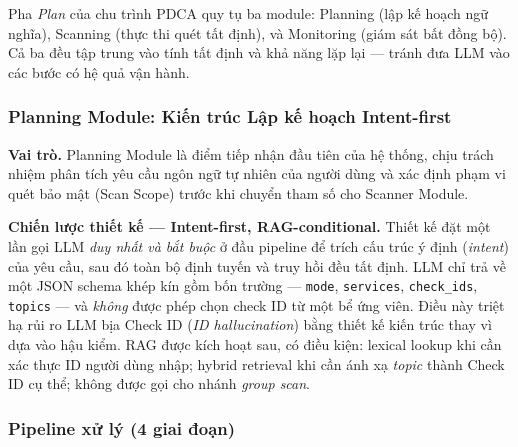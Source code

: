 Pha \textit{Plan} của chu trình PDCA quy tụ ba module: Planning (lập kế hoạch ngữ nghĩa), Scanning (thực thi quét tất định), và Monitoring (giám sát bất đồng bộ). Cả ba đều tập trung vào tính tất định và khả năng lặp lại — tránh đưa LLM vào các bước có hệ quả vận hành.

\subsubsection*{Planning Module: Kiến trúc Lập kế hoạch Intent-first}
\label{sub:planning_module}
\label{subsec:planning_module}

\textbf{Vai trò.} Planning Module là điểm tiếp nhận đầu tiên của hệ thống, chịu trách nhiệm phân tích yêu cầu ngôn ngữ tự nhiên của người dùng và xác định phạm vi quét bảo mật (Scan Scope) trước khi chuyển tham số cho Scanner Module.

\textbf{Chiến lược thiết kế --- Intent-first, RAG-conditional.} Thiết kế đặt một lần gọi LLM \textit{duy nhất và bắt buộc} ở đầu pipeline để trích cấu trúc ý định (\textit{intent}) của yêu cầu, sau đó toàn bộ định tuyến và truy hồi đều tất định. LLM chỉ trả về một JSON schema khép kín gồm bốn trường --- \texttt{mode}, \texttt{services}, \texttt{check\_ids}, \texttt{topics} --- và \textit{không} được phép chọn check ID từ một bể ứng viên. Điều này triệt hạ rủi ro LLM bịa Check ID (\textit{ID hallucination}) bằng thiết kế kiến trúc thay vì dựa vào hậu kiểm. RAG được kích hoạt sau, có điều kiện: lexical lookup khi cần xác thực ID người dùng nhập; hybrid retrieval khi cần ánh xạ \textit{topic} thành Check ID cụ thể; không được gọi cho nhánh \textit{group scan}.

\subsubsection*{Pipeline xử lý (4 giai đoạn)}

